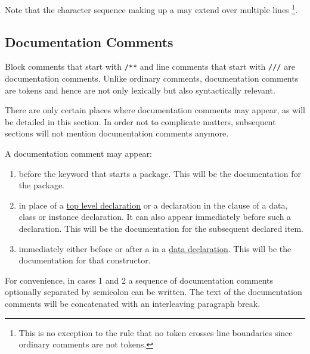 Note that the character sequence making up a  may extend over multiple lines
\footnote{This is no exception to the rule that no token crosses line
boundaries since ordinary comments are not tokens.}.


\subsection{Documentation Comments} \label{doccomment} 

Block comments that start with \texttt{/**} and line comments that start with \texttt{///} are documentation comments.
Unlike ordinary comments, documentation comments are tokens and hence are not only lexically but also syntactically relevant.

There are only certain places where documentation comments may appear, as will be detailed in this section. 
In order not to complicate matters, subsequent sections will not mention documentation comments anymore.

A documentation comment may appear:
\begin{enumerate}
\item before the  keyword that starts a package. This will be the documentation for the package.
\item in place of a \hyperref[declarations]{top level declaration} or a declaration in the  clause of a data, class or instance declaration. It can also appear immediately before such a declaration.
This will be the documentation for the subsequent declared item. 
\item immediately either before or after a  in a \hyperref[algdcl]{data declaration}. This will be the documentation for that constructor.
\end{enumerate}

For convenience, in cases 1 and 2 a sequence of documentation comments optionally separated by semicolon can be written.
The text of the documentation comments will be concatenated with an interleaving paragraph break.



